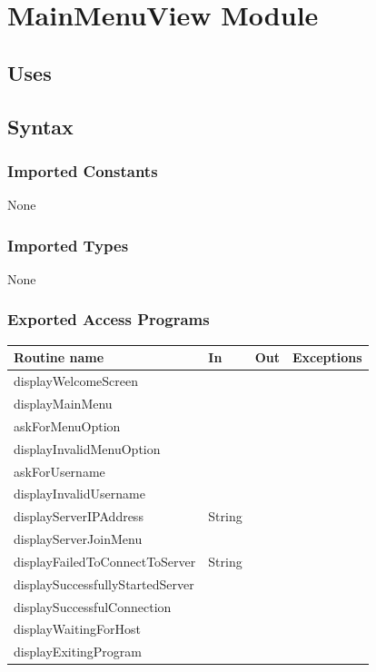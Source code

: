 \documentclass[12pt, titlepage]{article}
\begin{document}
        
        
        
\section* {MainMenuView Module}
    \subsection* {Uses}
    \subsection* {Syntax}
    
        \subsubsection* {Imported Constants}
            None
        \subsubsection* {Imported Types}
            None
        \subsubsection* {Exported Access Programs}
        
        \begin{tabular}{| l | l | l | p{6cm} |}
            \hline
            \textbf{Routine name} & \textbf{In} & \textbf{Out} & \textbf{Exceptions}\\
            \hline
            displayWelcomeScreen &  &  & \\
            \hline
            displayMainMenu &  &  &\\
            \hline 
            askForMenuOption &  &  & \\
            \hline 
            displayInvalidMenuOption &  &  &\\
            \hline 
            askForUsername &  &  & \\
            \hline
            displayInvalidUsername &  &  &\\
            \hline 
            displayServerIPAddress & String &  & \\
            \hline 
            displayServerJoinMenu &  &  &\\
            \hline 
            displayFailedToConnectToServer & String &  & \\
            \hline
            displaySuccessfullyStartedServer &  &  &\\
            \hline 
            displaySuccessfulConnection &  &  & \\
            \hline 
            displayWaitingForHost &  &  &\\
            \hline 
            displayExitingProgram &  &  &\\
            \hline 
        \end{tabular}
        
\end{document}
